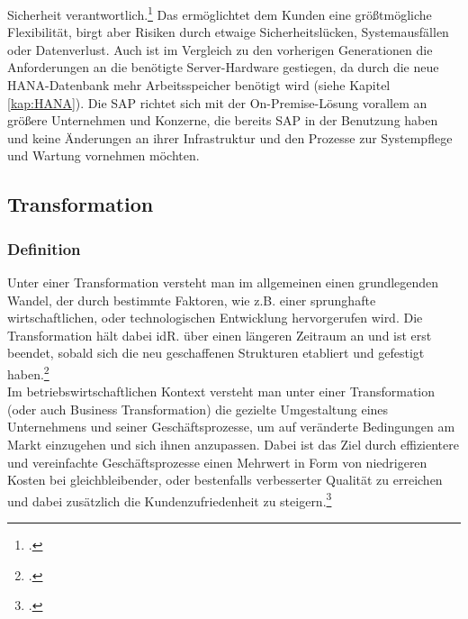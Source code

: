 Sicherheit verantwortlich.\footcite[Vgl.][]{rz10-s4hana} Das ermöglichtet dem Kunden eine größtmögliche Flexibilität, birgt aber Risiken durch etwaige Sicherheitslücken, Systemausfällen oder Datenverlust. Auch ist im Vergleich zu den vorherigen Generationen die Anforderungen an die benötigte Server-Hardware gestiegen, da durch die neue HANA-Datenbank mehr Arbeitsspeicher benötigt wird (siehe Kapitel \ref{kap:HANA}). Die SAP richtet sich mit der On-Premise-Lösung vorallem an größere Unternehmen und Konzerne, die bereits SAP in der Benutzung haben und keine Änderungen an ihrer Infrastruktur und den Prozesse zur Systempflege und Wartung vornehmen möchten.  

\subsection{Transformation}
\subsubsection{Definition}
Unter einer Transformation versteht man im allgemeinen einen grundlegenden Wandel, der durch bestimmte Faktoren, wie z.B. einer sprunghafte wirtschaftlichen, oder technologischen Entwicklung hervorgerufen wird. Die Transformation hält dabei idR. über einen längeren Zeitraum an und ist erst beendet, sobald sich die neu geschaffenen Strukturen etabliert und gefestigt haben.\footcite[Vgl.][]{difu}\\ Im betriebswirtschaftlichen Kontext versteht man unter einer Transformation (oder auch Business Transformation) die gezielte Umgestaltung eines Unternehmens und seiner Geschäftsprozesse, um auf veränderte Bedingungen am Markt einzugehen und sich ihnen anzupassen. Dabei ist das Ziel durch effizientere und vereinfachte Geschäftsprozesse einen Mehrwert in Form von niedrigeren Kosten bei gleichbleibender, oder bestenfalls verbesserter Qualität zu erreichen und dabei zusätzlich die Kundenzufriedenheit zu steigern.\footcite[Vgl.][]{leanix}

